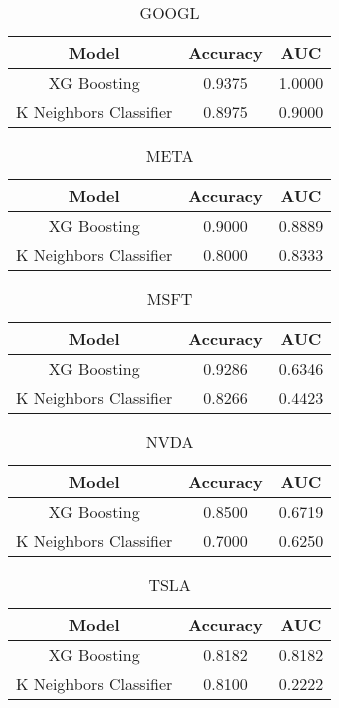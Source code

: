 \documentclass{article}
\begin{document}
\begin{table}[h]
\centering
\begin{tabular}{ccc}
\hline
\textbf{Model} & \textbf{Accuracy} & \textbf{AUC} \\ \hline
XG Boosting & 0.9375 & 1.0000 \\
K Neighbors Classifier & 0.8975 & 0.9000 \\ \hline
\end{tabular}
\caption{GOOGL}
\end{table}
\begin{table}[h]
\centering
\begin{tabular}{ccc}
\hline
\textbf{Model} & \textbf{Accuracy} & \textbf{AUC} \\ \hline
XG Boosting & 0.9000  & 0.8889 \\
K Neighbors Classifier & 0.8000 & 0.8333 \\ \hline
\end{tabular}
\caption{META}
\end{table}
\begin{table}[h]
\centering
\begin{tabular}{ccc}
\hline
\textbf{Model} & \textbf{Accuracy} & \textbf{AUC} \\ \hline
XG Boosting & 0.9286  & 0.6346 \\
K Neighbors Classifier & 0.8266 & 0.4423 \\ \hline
\end{tabular}
\caption{MSFT}
\end{table}
\begin{table}[h]
\centering
\begin{tabular}{ccc}
\hline
\textbf{Model} & \textbf{Accuracy} & \textbf{AUC} \\ \hline
XG Boosting & 0.8500  & 0.6719	 \\
K Neighbors Classifier & 0.7000 & 0.6250 \\ \hline
\end{tabular}
\caption{NVDA}
\end{table}
\begin{table}[h]
\centering
\begin{tabular}{ccc}
\hline
\textbf{Model} & \textbf{Accuracy} & \textbf{AUC} \\ \hline
XG Boosting & 0.8182  & 0.8182	 \\
K Neighbors Classifier & 0.8100 & 0.2222 \\ \hline
\end{tabular}
\caption{TSLA}
\end{table}
\end{document}
